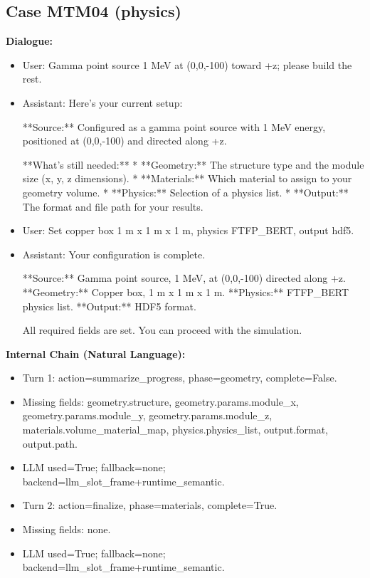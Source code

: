 \documentclass[11pt]{ctexart}
\begin{document}
\subsection{Case MTM04 (physics)}
\textbf{Dialogue:}
\begin{itemize}
\item User: Gamma point source 1 MeV at (0,0,-100) toward +z; please build the rest.
\item Assistant: Here's your current setup:

**Source:** Configured as a gamma point source with 1 MeV energy, positioned at (0,0,-100) and directed along +z.

**What's still needed:**
*   **Geometry:** The structure type and the module size (x, y, z dimensions).
*   **Materials:** Which material to assign to your geometry volume.
*   **Physics:** Selection of a physics list.
*   **Output:** The format and file path for your results.
\item User: Set copper box 1 m x 1 m x 1 m, physics FTFP\_BERT, output hdf5.
\item Assistant: Your configuration is complete.

**Source:** Gamma point source, 1 MeV, at (0,0,-100) directed along +z.
**Geometry:** Copper box, 1 m x 1 m x 1 m.
**Physics:** FTFP\_BERT physics list.
**Output:** HDF5 format.

All required fields are set. You can proceed with the simulation.
\end{itemize}
\textbf{Internal Chain (Natural Language):}
\begin{itemize}
\item Turn 1: action=summarize\_progress, phase=geometry, complete=False.
\item Missing fields: geometry.structure, geometry.params.module\_x, geometry.params.module\_y, geometry.params.module\_z, materials.volume\_material\_map, physics.physics\_list, output.format, output.path.
\item LLM used=True; fallback=none; backend=llm\_slot\_frame+runtime\_semantic.
\item Turn 2: action=finalize, phase=materials, complete=True.
\item Missing fields: none.
\item LLM used=True; fallback=none; backend=llm\_slot\_frame+runtime\_semantic.
\end{itemize}
\end{document}
